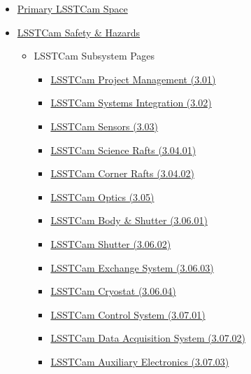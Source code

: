 \begin{small}
\begin{itemize}
	\item \href{https://confluence.slac.stanford.edu/display/LSSTCAM}{Primary LSSTCam Space}
	\item \href{https://confluence.slac.stanford.edu/pages/viewpage.action?pageId=130884078}{LSSTCam Safety \& Hazards}
	\begin{itemize}
		\item LSSTCam Subsystem Pages
		\begin{itemize}
			\item \href{https://confluence.slac.stanford.edu/display/LSSTCAM/3.01+Project+Management}{LSSTCam Project Management (3.01)}
			\item \href{https://confluence.slac.stanford.edu/display/LSSTCAM/3.02+Camera+Systems+Integration}{LSSTCam Systems Integration (3.02)}
			\item \href{https://confluence.slac.stanford.edu/display/LSSTCAM/3.03+Sensors}{LSSTCam Sensors (3.03)}
			\item \href{https://confluence.slac.stanford.edu/display/LSSTCAM/3.04.01+Camera+Science+Raft}{LSSTCam Science Rafts (3.04.01)}
			\item \href{https://confluence.slac.stanford.edu/display/LSSTCAM/3.04.02+Corner+Rafts}{LSSTCam Corner Rafts (3.04.02)}
			\item \href{https://confluence.slac.stanford.edu/display/LSSTCAM/3.05+Optics}{LSSTCam Optics (3.05)}
			\item \href{https://confluence.slac.stanford.edu/display/LSSTCAM/3.06.01-.02+Camera+Body+and+Shutter}{LSSTCam Body \& Shutter (3.06.01)}
			\item \href{https://confluence.slac.stanford.edu/display/LSSTCAM/3.06.02+Shutter}{LSSTCam Shutter (3.06.02)}
			\item \href{https://confluence.slac.stanford.edu/display/LSSTCAM/3.06.03+Exchange+System}{LSSTCam Exchange System (3.06.03)}
			\item \href{https://confluence.slac.stanford.edu/display/LSSTCAM/3.06.04+Cryostat}{LSSTCam Cryostat (3.06.04)}
			\item \href{https://confluence.slac.stanford.edu/display/LSSTCAM/3.07.01+Camera+Control+System}{LSSTCam Control System (3.07.01)}
			\item \href{https://confluence.slac.stanford.edu/display/LSSTCAM/3.07.02+Data+Acquisition}{LSSTCam Data Acquisition System (3.07.02)}
			\item \href{https://confluence.slac.stanford.edu/display/LSSTCAM/3.07.03+Auxiliary+Electronics}{LSSTCam Auxiliary Electronics (3.07.03)}

\end{itemize}
\end{itemize}
\end{itemize}
\end{small}

